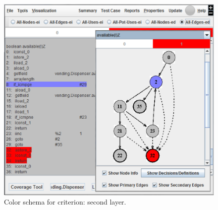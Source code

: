 
\begin{figure}[!ht]
\begin{center}
\includegraphics[height=0.40\textheight]{fig/sec-edges-layer2.eps}
\caption{\label{fig:sec-edges-2} Color schema for
 criterion: second layer.}
\end{center}
\end{figure}
